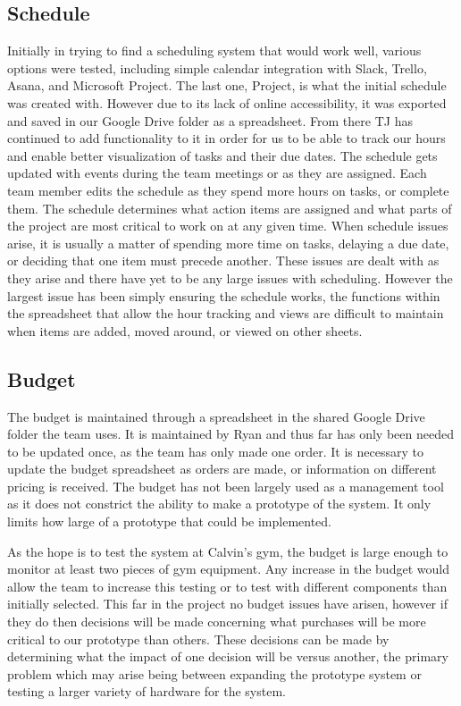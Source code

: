 \documentclass[ppfs.tex]{template/subfiles}
\begin{document}
    \subsection{Schedule}
	Initially in trying to find a scheduling system that would work well, various options were tested, including simple calendar integration with Slack, Trello, Asana, and Microsoft Project. The last one, Project, is what the initial schedule was created with. However due to its lack of online accessibility, it was exported and saved in our Google Drive folder as a spreadsheet. From there TJ has continued to add functionality to it in order for us to be able to track our hours and enable better visualization of tasks and their due dates. The schedule gets updated with events during the team meetings or as they are assigned. Each team member edits the schedule as they spend more hours on tasks, or complete them. The schedule determines what action items are assigned and what parts of the project are most critical to work on at any given time. When schedule issues arise, it is usually a matter of spending more time on tasks, delaying a due date, or deciding that one item must precede another. These issues are dealt with as they arise and there have yet to be any large issues with scheduling. However the largest issue has been simply ensuring the schedule works, the functions within the spreadsheet that allow the hour tracking and views are difficult to maintain when items are added, moved around, or viewed on other sheets. 
	
    \subsection{Budget}
    The budget is maintained through a spreadsheet in the shared Google Drive folder the team uses. It is maintained by Ryan and thus far has only been needed to be updated once, as the team has only made one order. It is necessary to update the budget spreadsheet as orders are made, or information on different pricing is received. The budget has not been largely used as a management tool as it does not constrict the ability to make a prototype of the system. It only limits how large of a prototype that could be implemented.  
    
    As the hope is to test the system at Calvin's gym, the budget is large enough to monitor at least two pieces of gym equipment. Any increase in the budget would allow the team to increase this testing or to test with different components than initially selected. This far in the project no budget issues have arisen, however if they do then decisions will be made concerning what purchases will be more critical to our prototype than others. These decisions can be made by determining what the impact of one decision will be versus another, the primary problem which may arise being between expanding the prototype system or testing a larger variety of hardware for the system. 
	
\end{document}
